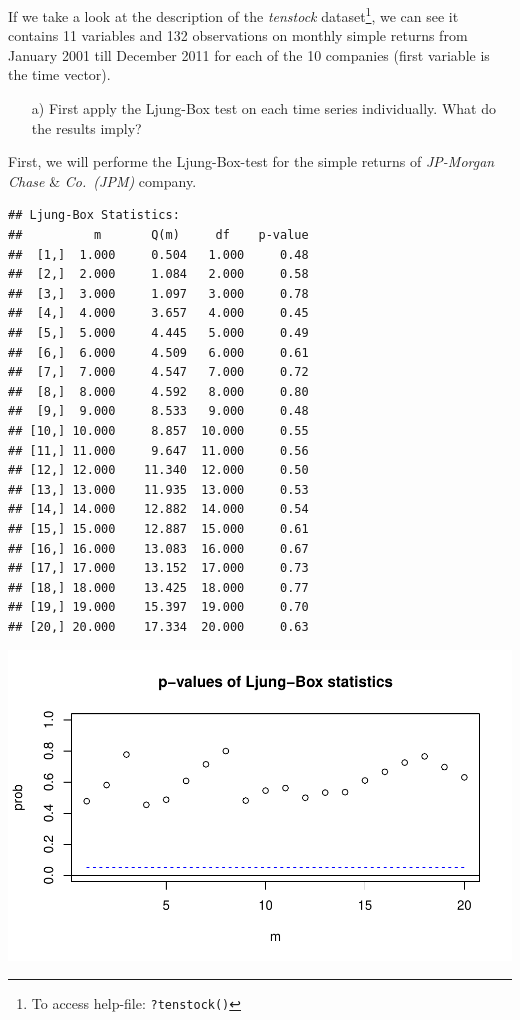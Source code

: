 \documentclass[12pt,a4paper]{article}
\newenvironment{Shaded}{\begin{snugshade}}{\end{snugshade}}
\newcommand{\DataTypeTok}[1]{\textcolor[rgb]{0.13,0.29,0.53}{#1}}
\newcommand{\DecValTok}[1]{\textcolor[rgb]{0.00,0.00,0.81}{#1}}
\newcommand{\KeywordTok}[1]{\textcolor[rgb]{0.13,0.29,0.53}{\textbf{#1}}}
\newcommand{\NormalTok}[1]{#1}
\newcommand{\OperatorTok}[1]{\textcolor[rgb]{0.81,0.36,0.00}{\textbf{#1}}}
\let\rmarkdownfootnote\footnote%
\def\footnote{\protect\rmarkdownfootnote}
\begin{document}
If we take a look at the description of the \emph{tenstock}
dataset\footnote{To access help-file: \texttt{?tenstock()}}, we can see
it contains 11 variables and 132 observations on monthly simple returns
from January 2001 till December 2011 for each of the 10 companies (first
variable is the time vector).

\begin{itemize}
  \item[a)] First apply the Ljung-Box test on each time series individually. What do the results imply?
\end {itemize}

First, we will performe the Ljung-Box-test for the simple returns of
\emph{JP-Morgan Chase} \& \emph{Co.~(JPM)} company.

\begin{Shaded}
\end{Shaded}

\begin{verbatim}
## Ljung-Box Statistics:  
##          m       Q(m)     df    p-value
##  [1,]  1.000     0.504   1.000     0.48
##  [2,]  2.000     1.084   2.000     0.58
##  [3,]  3.000     1.097   3.000     0.78
##  [4,]  4.000     3.657   4.000     0.45
##  [5,]  5.000     4.445   5.000     0.49
##  [6,]  6.000     4.509   6.000     0.61
##  [7,]  7.000     4.547   7.000     0.72
##  [8,]  8.000     4.592   8.000     0.80
##  [9,]  9.000     8.533   9.000     0.48
## [10,] 10.000     8.857  10.000     0.55
## [11,] 11.000     9.647  11.000     0.56
## [12,] 12.000    11.340  12.000     0.50
## [13,] 13.000    11.935  13.000     0.53
## [14,] 14.000    12.882  14.000     0.54
## [15,] 15.000    12.887  15.000     0.61
## [16,] 16.000    13.083  16.000     0.67
## [17,] 17.000    13.152  17.000     0.73
## [18,] 18.000    13.425  18.000     0.77
## [19,] 19.000    15.397  19.000     0.70
## [20,] 20.000    17.334  20.000     0.63
\end{verbatim}

\includegraphics{exercise_1_files/figure-latex/unnamed-chunk-3-1.pdf}
\end{document}
